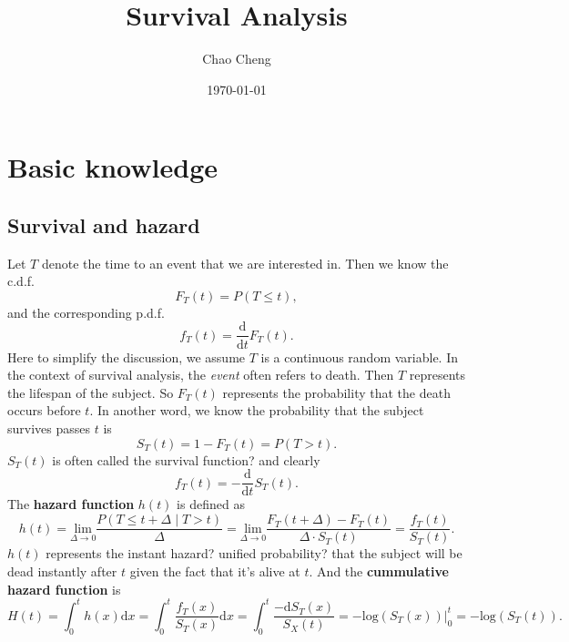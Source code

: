 \documentclass[a4paper,12pt]{article}
\title{Survival Analysis}
\author{Chao Cheng}
\date{\today}
\begin{document}
\maketitle
\tableofcontents{}

\section{Basic knowledge}
\label{sec:basic-knowledge}

\subsection{Survival and hazard}
\label{sec:survival-hazard}

Let $T$ denote the time to an event that we are interested in. Then we know the c.d.f.
\[
  F_T\left(t\right) = P\left(T \leq t\right)
  ,
\]
and the corresponding p.d.f.
\[
  f_T\left(t\right) = \frac{\mathrm{d}}{\mathrm{d}t}F_T\left(t\right)
  .
\]
Here to simplify the discussion, we assume $T$ is a continuous random variable. In the context of survival analysis, the \emph{event} often refers to death. Then $T$ represents the lifespan of the subject. So $F_T\left(t\right)$ represents the probability that the death occurs before $t$. In another word, we know the probability that the subject survives passes $t$ is
\[
  S_T\left(t\right) = 1 - F_T\left(t\right) = P\left(T > t\right)
  .
\]
$S_T\left(t\right)$ is often called the {\color{red} survival function?} and clearly
\[
  f_T\left(t\right) = - \frac{\mathrm{d}}{\mathrm{d}t}S_T\left(t\right)
  .
\]
The \textbf{hazard function} $h\left(t\right)$ is defined as
\begin{equation}
  \label{eq:def_hazard_function}
    h\left(t\right) = \underset{\Delta\to0}{\mathrm{lim}}
  \frac{
    P\left(
      T \leq t + \Delta \middle| T > t
    \right)
  }{\Delta}
  = \underset{\Delta\to0}{\mathrm{lim}}
  \frac{
    F_T\left(t + \Delta\right) - F_T\left(t\right)
  }{\Delta \cdot S_T\left(t\right)}
  = \frac{f_T\left(t\right)}{S_T\left(t\right)}
  .
\end{equation}
$h\left(t\right)$ represents the {\color{red} instant hazard? unified probability?} that the subject will be dead instantly after $t$ given the fact that it's alive at $t$. And the \textbf{cummulative hazard function} is
\[
  H\left(t\right) = \int_0^th\left(x\right)\mathrm{d}x
  = \int_0^t \frac{f_T\left(x\right)}{S_T\left(x\right)}\mathrm{d}x
  = \int_0^t\frac{-\mathrm{d}S_T\left(x\right)}{S_X\left(t\right)}
  = \left. -\mathrm{log}\left(S_T\left(x\right)\right)\right|_0^t
  = - \mathrm{log}\left(S_T\left(t\right)\right)
  .
\]
\end{document}
